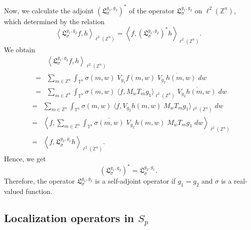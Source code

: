 \documentclass[a4paper,11pt, reqno]{amsart}
\theoremstyle{plain}
\theoremstyle{definition}
\theoremstyle{remark}
\def \Z{{\mathbb Z}}
\def \T{{\mathbb T}}
\begin{document}
Now, we calculate the adjoint $(\mathfrak{L}^{g_1, g_2}_{\sigma})^*$ of the operator $\mathfrak{L}^{g_1, g_2}_{\sigma}$ on $\ell^2(\Z^n)$, which determined by the relation
\[ \left\langle \mathfrak{L}^{g_1, g_2}_{\sigma}f , h \right\rangle_{\ell^2(\Z^n)}= \left\langle f , (\mathfrak{L}^{g_1, g_2}_{\sigma})^*h \right\rangle_{\ell^2(\Z^n)}. \] 
We obtain
\begin{eqnarray*}
&& \left\langle \mathfrak{L}^{g_1, g_2}_{\sigma}f , h \right\rangle_{\ell^2(\Z^n)} \\
&=& \sum_{m \in \Z^n}  \int_{\T^n} \sigma(m, w) \; V_{g_1}f(m,w) \; \overline{V_{g_2}h(m,w)} \; dw \\
&=& \sum_{m \in \Z^n}  \int_{\T^n} \sigma(m, w) \; \langle f, M_w T_m g_1 \rangle_{\ell^2(\Z^n)}  \; \overline{V_{g_2}h(m,w)} \; dw 
\end{eqnarray*}
\begin{eqnarray*}
&=& \sum_{m \in \Z^n}  \int_{\T^n} \sigma(m, w) \; \langle f, V_{g_2}h(m,w) \; M_w T_m g_1 \rangle_{\ell^2(\Z^n)}  \; dw \\
&=&  \left\langle f, \sum_{m \in \Z^n}  \int_{\T^n} \overline{\sigma(m, w)} \; V_{g_2}h(m,w) \; M_w T_m g_1 \; dw \right\rangle_{\ell^2(\Z^n)} \\
&=& \left\langle f, \mathfrak{L}^{g_2, g_1}_{\overline{\sigma}}h \right\rangle_{\ell^2(\Z^n)}.
\end{eqnarray*}
Hence, we get
\[ (\mathfrak{L}^{g_1, g_2}_{\sigma})^* = \mathfrak{L}^{g_2, g_1}_{\overline{\sigma}}. \]
Therefore, the operator $\mathfrak{L}^{g_1, g_2}_{\sigma}$ is a self-adjoint operator if $g_1=g_2$ and $\sigma$ is a real-valued function.

\subsection{Localization operators in $S_p$}
     
\end{document}

